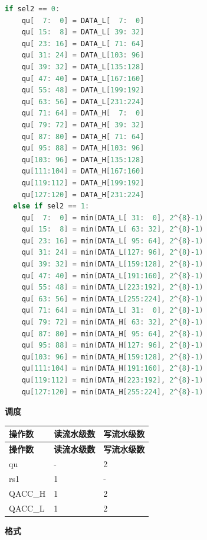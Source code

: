 \begin{lstlisting}[language=C, escapechar=@]
  if sel2 == 0:
    qu[  7:  0] = DATA_L[  7:  0]
    qu[ 15:  8] = DATA_L[ 39: 32]
    qu[ 23: 16] = DATA_L[ 71: 64]
    qu[ 31: 24] = DATA_L[103: 96]
    qu[ 39: 32] = DATA_L[135:128]
    qu[ 47: 40] = DATA_L[167:160]
    qu[ 55: 48] = DATA_L[199:192]
    qu[ 63: 56] = DATA_L[231:224]
    qu[ 71: 64] = DATA_H[  7:  0]
    qu[ 79: 72] = DATA_H[ 39: 32]
    qu[ 87: 80] = DATA_H[ 71: 64]
    qu[ 95: 88] = DATA_H[103: 96]
    qu[103: 96] = DATA_H[135:128]
    qu[111:104] = DATA_H[167:160]
    qu[119:112] = DATA_H[199:192]
    qu[127:120] = DATA_H[231:224]
  else if sel2 == 1:
    qu[  7:  0] = min(DATA_L[ 31:  0], 2^{8}-1)
    qu[ 15:  8] = min(DATA_L[ 63: 32], 2^{8}-1)
    qu[ 23: 16] = min(DATA_L[ 95: 64], 2^{8}-1)
    qu[ 31: 24] = min(DATA_L[127: 96], 2^{8}-1)
    qu[ 39: 32] = min(DATA_L[159:128], 2^{8}-1)
    qu[ 47: 40] = min(DATA_L[191:160], 2^{8}-1)
    qu[ 55: 48] = min(DATA_L[223:192], 2^{8}-1)
    qu[ 63: 56] = min(DATA_L[255:224], 2^{8}-1)
    qu[ 71: 64] = min(DATA_L[ 31:  0], 2^{8}-1)
    qu[ 79: 72] = min(DATA_H[ 63: 32], 2^{8}-1)
    qu[ 87: 80] = min(DATA_H[ 95: 64], 2^{8}-1)
    qu[ 95: 88] = min(DATA_H[127: 96], 2^{8}-1)
    qu[103: 96] = min(DATA_H[159:128], 2^{8}-1)
    qu[111:104] = min(DATA_H[191:160], 2^{8}-1)
    qu[119:112] = min(DATA_H[223:192], 2^{8}-1)
    qu[127:120] = min(DATA_H[255:224], 2^{8}-1)

\end{lstlisting}

\textbf{调度}\\
\begin{longtable}[c]{|l|l|l|}
    \hline
    \rowcolor{lightgray}
    \textbf{操作数} & \textbf{读流水级数} & \textbf{写流水级数} \\\hline
    \endfirsthead
    \hline
    \rowcolor{lightgray}
     \textbf{操作数} & \textbf{读流水级数} & \textbf{写流水级数} \\\hline
    \endhead
    \hline
    \endfoot

  qu & - & 2 \\\hline
  rs1 & 1 & - \\\hline
  QACC\_H & 1 & 2 \\\hline
  QACC\_L & 1 & 2

\end{longtable}

\textbf{格式}\\


